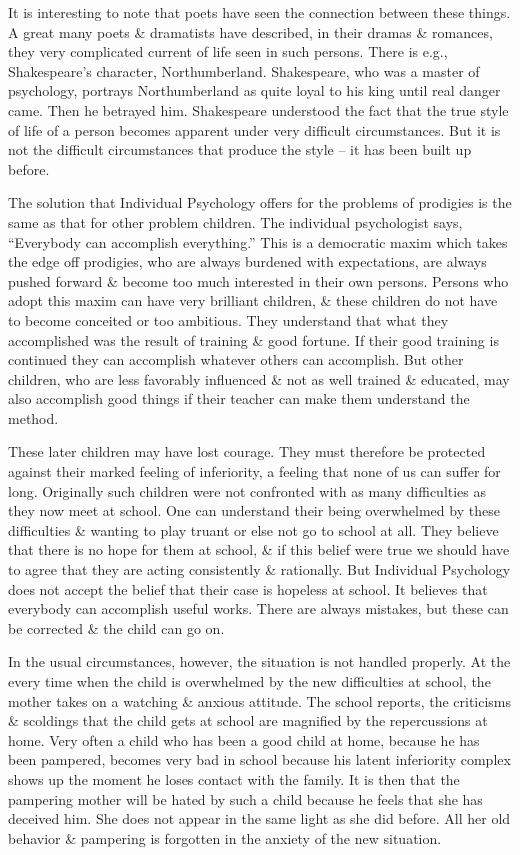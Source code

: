 \documentclass{article}
\numberwithin{equation}{section}
\begin{document}
It is interesting to note that poets have seen the connection between these things. A great many poets \& dramatists have described, in their dramas \& romances, they very complicated current of life seen in such persons. There is e.g., Shakespeare's character, Northumberland. Shakespeare, who was a master of psychology, portrays Northumberland as quite loyal to his king until real danger came. Then he betrayed him. Shakespeare understood the fact that the true style of life of a person becomes apparent under very difficult circumstances. But it is not the difficult circumstances that produce the style -- it has been built up before.

The solution that Individual Psychology offers for the problems of prodigies is the same as that for other problem children. The individual psychologist says, ``Everybody can accomplish everything.'' This is a democratic maxim which takes the edge off prodigies, who are always burdened with expectations, are always pushed forward \& become too much interested in their own persons. Persons who adopt this maxim can have very brilliant children, \& these children do not have to become conceited or too ambitious. They understand that what they accomplished was the result of training \& good fortune. If their good training is continued they can accomplish whatever others can accomplish. But other children, who are less favorably influenced \& not as well trained \& educated, may also accomplish good things if their teacher can make them understand the method.

These later children may have lost courage. They must therefore be protected against their marked feeling of inferiority, a feeling that none of us can suffer for long. Originally such children were not confronted with as many difficulties as they now meet at school. One can understand their being overwhelmed by these difficulties \& wanting to play truant or else not go to school at all. They believe that there is no hope for them at school, \& if this belief were true we should have to agree that they are acting consistently \& rationally. But Individual Psychology does not accept the belief that their case is hopeless at school. It believes that everybody can accomplish useful works. There are always mistakes, but these can be corrected \& the child can go on.

In the usual circumstances, however, the situation is not handled properly. At the every time when the child is overwhelmed by the new difficulties at school, the mother takes on a watching \& anxious attitude. The school reports, the criticisms \& scoldings that the child gets at school are magnified by the repercussions at home. Very often a child who has been a good child at home, because he has been pampered, becomes very bad in school because his latent inferiority complex shows up the moment he loses contact with the family. It is then that the pampering mother will be hated by such a child because he feels that she has deceived him. She does not appear in the same light as she did before. All her old behavior \& pampering is forgotten in the anxiety of the new situation.
\end{document}
